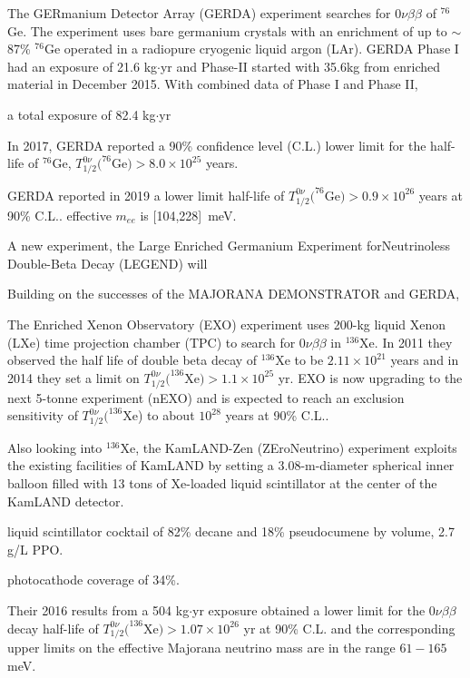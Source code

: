 The GERmanium Detector Array (GERDA) experiment searches for $0\nu\beta\beta$ of $^{76}$Ge. The experiment uses bare germanium crystals with an enrichment of up to $\sim$87\% $^{76}$Ge operated in a radiopure cryogenic liquid argon (LAr)\cite{agostini2016search}. GERDA Phase I had an exposure of 21.6 kg$\cdot$yr and Phase-II started with 35.6kg from enriched material in December 2015. With combined data of Phase I and Phase II, 

a total exposure of 82.4 kg$\cdot$yr 

In 2017, GERDA reported a 90\% confidence level (C.L.) lower limit for the half-life of $^{76}$Ge, $T^{0\nu}_{1/2}(^{76}$Ge$)>8.0\times 10^{25}$ years.

GERDA reported in 2019 a lower limit half-life of $T^{0\nu}_{1/2}(^{76}$Ge$)>0.9\times 10^{26}$ years at 90\% C.L.\cite{agostini2019probing}. effective $m_{ee}$ is [104,228]~meV.

A new experiment, the Large Enriched Germanium Experiment forNeutrinoless Double-Beta Decay (LEGEND) will 



Building on the successes of the MAJORANA DEMONSTRATOR and GERDA,




The Enriched Xenon Observatory (EXO) experiment uses 200-kg liquid Xenon (LXe) time projection chamber (TPC) to search for $0\nu\beta\beta$ in $^{136}$Xe. In 2011 they observed the half life of double beta decay of $^{136}$Xe to be $2.11\times 10^{21}$ years and in 2014 they set a limit on $T^{0\nu}_{1/2}(^{136}$Xe$)>1.1\times 10^{25}$ yr\cite{albert2014search}. EXO is now upgrading to the next 5-tonne experiment (nEXO) and is expected to reach an exclusion sensitivity of $T^{0\nu}_{1/2}(^{136}$Xe) to about $10^{28}$ years at 90\% C.L.\cite{albert2018sensitivity}.

Also looking into $^{136}$Xe, the KamLAND-Zen (ZEroNeutrino) experiment exploits the existing facilities of KamLAND by setting a 3.08-m-diameter spherical inner balloon filled with 13 tons of Xe-loaded liquid scintillator at the center of the KamLAND detector.

liquid scintillator cocktail of 82\% decane and 18\% pseudocumene by volume, 2.7 g/L PPO.

photocathode coverage of 34\%.

Their 2016 results from a 504 kg$\cdot$yr exposure obtained a lower limit for the $0\nu\beta\beta$ decay half-life of $T^{0\nu}_{1/2}(^{136}$Xe$)>1.07\times 10^{26}$ yr at 90\% C.L. and the corresponding upper limits on the effective Majorana neutrino mass are in the range $61-165$ meV\cite{gando2016search}.

